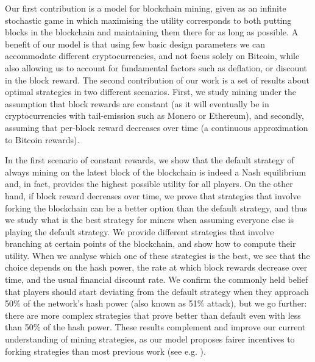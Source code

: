   Our first contribution 
is a model for blockchain mining, given as an infinite stochastic game in which maximising the utility corresponds to both 
putting blocks in the blockchain and maintaining them there for as long as possible. A
benefit of our model is that using few basic design parameters we can 
accommodate different cryptocurrencies, and not focus solely on Bitcoin,
while also allowing us to account for fundamental factors such as deflation, or discount in the block reward. 
The second contribution of our work is a set of results about optimal strategies in two different scenarios. First, 
we study mining under the assumption that block rewards are constant (as it will eventually be in cryptocurrencies with tail-emission such as Monero or Ethereum), and secondly, assuming that per-block reward decreases over time (a continuous approximation to Bitcoin rewards). 

In the first scenario of constant rewards, we show that the default strategy of always mining on the latest block of the blockchain is indeed a Nash equilibrium and, in fact, 
provides the highest possible utility for all players. 
On the other hand, if block reward decreases over time, we prove that strategies that involve forking the blockchain
can be a better option than the default strategy, and thus we study what is the best strategy for miners when assuming everyone else 
is playing the default strategy. We provide different strategies that involve branching at certain points of the blockchain, and show how to compute their 
utility. When we analyse which one of these strategies is the best, we see that the choice depends on the hash power, the rate at which 
block rewards decrease over time, and the usual financial discount rate. We confirm the commonly held belief that
players should start deviating from the default strategy 
when they approach 50\% of the network's hash power (also known as 51\% attack), but we go further: there are more complex strategies that 
prove better than default even with less than 50\% of the hash power. These results complement and improve our current understanding of mining strategies, 
as our model proposes fairer 
incentives to forking strategies than 
most previous work (see e.g. \cite{mininggames:2016,biais2018blockchain}).

